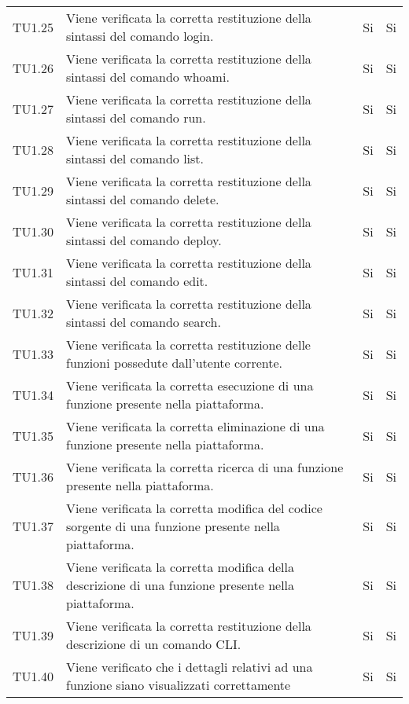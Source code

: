\begin{longtable}{
		>{\centering}p{}
		>{}p{}
		>{\centering}p{}
		>{\centering}p{} }
		TU1.25 &
		Viene verificata la corretta restituzione della sintassi del comando login\ped{\textit{G}}. &
		Si &
		Si \tabularnewline
		
		TU1.26 &
		Viene verificata la corretta restituzione della sintassi del comando whoami. &
		Si &
		Si \tabularnewline
		
		TU1.27 &
		Viene verificata la corretta restituzione della sintassi del comando run. &
		Si &
		Si \tabularnewline
		
		TU1.28 &
		Viene verificata la corretta restituzione della sintassi del comando list. &
		Si &
		Si \tabularnewline
		
		TU1.29 &
		Viene verificata la corretta restituzione della sintassi del comando delete. &
		Si &
		Si \tabularnewline
		
		TU1.30 &
		Viene verificata la corretta restituzione della sintassi del comando deploy. &
		Si &
		Si \tabularnewline
		
		TU1.31 &
		Viene verificata la corretta restituzione della sintassi del comando edit. &
		Si &
		Si \tabularnewline
		
		TU1.32 &
		Viene verificata la corretta restituzione della sintassi del comando search. &
		Si &
		Si \tabularnewline
		
		TU1.33 &
		Viene verificata la corretta restituzione delle funzioni possedute dall'utente corrente. &
		Si &
		Si \tabularnewline
		
		TU1.34 &
		Viene verificata la corretta esecuzione di una funzione presente nella piattaforma. &
		Si &
		Si \tabularnewline
		
		TU1.35 &
		Viene verificata la corretta eliminazione di una funzione presente nella piattaforma. &
		Si &
		Si \tabularnewline
		
		TU1.36 &
		Viene verificata la corretta ricerca di una funzione presente nella piattaforma.  &
		Si &
		Si \tabularnewline
		
		TU1.37 &
		Viene verificata la corretta modifica del codice sorgente di una funzione presente nella piattaforma. &
		Si &
		Si \tabularnewline
		
		TU1.38 &
		Viene verificata la corretta modifica della descrizione di una funzione presente nella piattaforma. &
		Si &
		Si \tabularnewline

		TU1.39 &
		Viene verificata la corretta restituzione della descrizione di un comando CLI\ped{\textit{G}}. &
		Si &
		Si \tabularnewline
		
		TU1.40 &
		Viene verificato che i dettagli relativi ad una funzione siano visualizzati correttamente &
		Si &
		Si \tabularnewline
		

\end{longtable}
